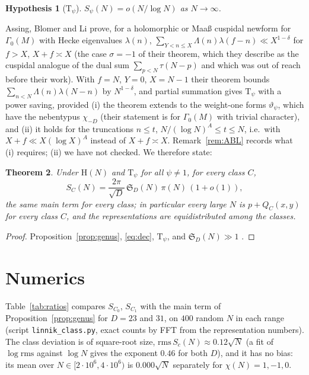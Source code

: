 ﻿\documentclass[11pt]{amsart}
\newtheorem{theorem}{Theorem}[section]
\newtheorem{hypothesis}[theorem]{Hypothesis}
\theoremstyle{remark}
\newcommand{\sS}{\mathfrak S}
\newcommand{\vt}{\vartheta}
\begin{document}
\begin{hypothesis}[$\mathrm{T}_\psi$]\label{hyp:T}
$S_\psi(N)=o(N/\log N)$ as $N\to\infty$.
\end{hypothesis}

Assing, Blomer and Li \cite[Theorem~1.3]{ABL} prove, for a holomorphic or Maa\ss{} cuspidal newform for $\Gamma_0(M)$ with Hecke eigenvalues $\lambda(n)$, $\sum_{Y<n\le X}\Lambda(n)\lambda(f-n)\ll X^{1-\delta}$ for $f>X$, $X+f\asymp X$ (the case $\sigma=-1$ of their theorem, which they describe as the cuspidal analogue of the dual sum $\sum_{p<N}\tau(N-p)$ and which was out of reach before their work). With $f=N$, $Y=0$, $X=N-1$ their theorem bounds $\sum_{n<N}\Lambda(n)\lambda(N-n)$ by $N^{1-\delta}$, and partial summation gives $\mathrm T_\psi$ with a power saving, provided (i) the theorem extends to the weight-one forms $\vt_\psi$, which have the nebentypus $\chi_{-D}$ (their statement is for $\Gamma_0(M)$ with trivial character), and (ii) it holds for the truncations $n\le t$, $N/(\log N)^{A}\le t\le N$, i.e.\ with $X+f\ll X(\log X)^A$ instead of $X+f\asymp X$. Remark~\ref{rem:ABL} records what (i) requires; (ii) we have not checked. We therefore state:

\begin{theorem}\label{thm:every}
Under $\mathrm H(N)$ and $\mathrm T_\psi$ for all $\psi\ne1$, for every class $C$,
\[
S_C(N)=\frac{2\pi}{\sqrt D}\,\sS_D(N)\,\pi(N)\,(1+o(1)),
\]
the same main term for every class; in particular every large $N$ is $p+Q_C(x,y)$ for every class $C$, and the representations are equidistributed among the classes.
\end{theorem}
\begin{proof}
Proposition~\ref{prop:genus}, \eqref{eq:dec}, $\mathrm T_\psi$, and $\sS_D(N)\gg1$ \cite[Theorem~1.2]{ChenL}.
\end{proof}

\section{Numerics}
Table~\ref{tab:ratios} compares $S_{C_0}$, $S_{C_1}$ with the main term of Proposition~\ref{prop:genus} for $D=23$ and $31$, on $400$ random $N$ in each range (script \texttt{linnik\_class.py}, exact counts by FFT from the representation numbers). The class deviation is of square-root size, $\mathrm{rms}\,S_c(N)\approx0.12\sqrt N$ (a fit of $\log\mathrm{rms}$ against $\log N$ gives the exponent $0.46$ for both $D$), and it has no bias: its mean over $N\in[2\cdot10^6,4\cdot10^6)$ is $0.000\sqrt N$ separately for $\chi(N)=1,-1,0$.
\end{document}

